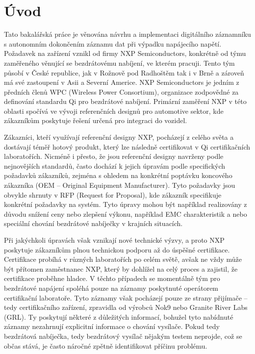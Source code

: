 
%


\chapter{Úvod}
\label{uvod}
Tato bakalářská práce je věnována návrhu a implementaci digitálního záznamníku s autonomním dokončením záznamu dat při výpadku napájecího napětí. Požadavek na zařízení vznikl od firmy NXP Semiconductors, konkrétně od týmu zaměřeného věnující se bezdrátovému nabíjení, ve kterém pracuji. Tento tým působí v České republice, jak v Rožnově pod Radhoštěm tak i v Brně a zároveň má své zastoupení v Asii a Severní Americe. NXP Semiconductors je jedním z předních členů WPC (Wireless Power Consortium), organizace zodpovědné za definování standardu Qi pro bezdrátové nabíjení. Primární zaměření NXP v této oblasti spočívá ve vývoji referenčních designů pro automotive sektor, kde zákazníkům poskytuje řešení určená pro integraci do vozidel.

Zákazníci, kteří využívají referenční designy NXP, pocházejí z celého světa a dostávají téměř hotový produkt, který lze následně certifikovat v Qi certifikačních laboratořích. Nicméně i přesto, že jsou referenční designy navrženy podle nejnovějších standardů, často dochází k jejich úpravám podle specifických požadavků zákazníků, zejména s ohledem na konkrétní poptávku koncového zákazníka (OEM – Original Equipment Manufacturer). Tyto požadavky jsou obvykle shrnuty v RFP (Request for Proposal), kde zákazník specifikuje konkrétní požadavky na systém. Tyto úpravy mohou být například realizovány z důvodu snížení ceny nebo zlepšení výkonu, například EMC charakteristik a nebo speciální chování bezdrátové nabíječky v krajních situacích. 

Při jakýchkoli úpravách však vznikají nové technické výzvy, a proto NXP poskytuje zákazníkům plnou technickou podporu až do úspěšné certifikace. Certifikace probíhá v různých laboratořích po celém světě, avšak ne vždy může být přítomen zaměstnanec NXP, který by dohlížel na celý proces a zajistil, že certifikace proběhne hladce. V těchto případech se momentálně tým pro bezdrátové napájení spoléhá pouze na záznamy poskytnuté operátorem certifikační laboratoře. Tyto záznamy však pocházejí pouze ze strany přijímače – tedy certifikačního zařízení, zpravidla od výrobců Nok9 nebo Granite River Labs (GRL). Ty poskytují některé z důležitých informací, bohužel tyto nabídnuté záznamy nezahrnují explicitní informace o chování vysílače. Pokud tedy bezdrátová nabíječka, tedy bezdrátový vysílač nějakým testem neprojde, což se občas stává, je často náročné zpětně identifikovat příčinu problému. \cite{nxp_wireless_charging_team}

